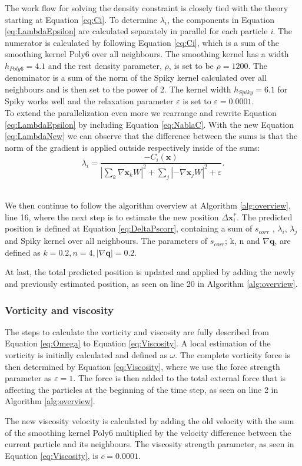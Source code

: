 The work flow for solving the density constraint is closely tied with the theory starting at Equation \ref{eq:Ci}.
To determine $\lambda_{i}$, the components in Equation \ref{eq:LambdaEpsilon} are calculated separately in parallel
for each particle \textit{i}.
The numerator is calculated by following Equation \ref{eq:Ci}, which is a sum of the smoothing kernel Poly6 over
all neighbours. The smoothing kernel has a width $h_{Poly6} = 4.1$ and the rest density parameter, $\rho$, is set to be $\rho = 1200$.
The denominator is a sum of the norm of the Spiky kernel calculated over all neighbours
and is then set to the power of 2. The kernel width $h_{Spiky} = 6.1$ for Spiky works well and the
relaxation parameter $\varepsilon$ is set to $\varepsilon = 0.0001$.
\\
\newline
To extend the parallelization even more we rearrange and rewrite Equation \ref{eq:LambdaEpsilon} by including Equation \ref{eq:NablaC}. With the
new Equation \ref{eq:LambdaNew} we can observe that the difference between the sums is that the norm of the gradient is applied
outside respectively inside of the sums:
\\
\begin{equation}
\label{eq:LambdaNew}
\lambda_i = \frac{- C_i(\mathbf{x}) }{ |\sum\limits_{k} \nabla \mathbf{x}_k W|^{2} + \sum\limits_{j} |-\nabla \mathbf{x}_j W|^2  + \varepsilon}.
\end{equation}
\\
\newline

We then continue to follow the algorithm overview at Algorithm \ref{alg:overview}, line 16, where the next step is to estimate the new position $\Delta \mathbf{x}^{*}_{i}$.
The predicted position is defined at Equation \ref{eq:DeltaPscorr}, containing a sum of $s_{corr}$ , $\lambda_{i}$, $\lambda_{j}$
and Spiky kernel over all neighbours.
The parameters of $s_{corr}$; k, n and $ \nabla \mathbf{q}$, are defined as $k = 0.2, n = 4, |\nabla \mathbf{q}| = 0.2$.

At last, the total predicted position is updated and applied by adding the newly and previously estimated position,
as seen on line 20 in Algorithm \ref{alg:overview}.

\subsubsection{Vorticity and viscosity}
The steps to calculate the vorticity and viscosity are fully described from Equation \ref{eq:Omega} to Equation \ref{eq:Viscosity}.
A local estimation of the vorticity is initially calculated and defined as $\omega$. The complete vorticity force is then determined
by Equation \ref{eq:Viscosity}, where we use the force strength parameter as $\varepsilon = 1$. The force is then added to the total
external force that is affecting the particles at the beginning of the time step, as seen on line 2 in Algorithm \ref{alg:overview}.

The new viscosity velocity is calculated by adding the old velocity with the sum of the smoothing kernel Poly6 multiplied by the velocity difference between
the current particle and its neighbours. The viscosity strength parameter, as seen in Equation \ref{eq:Viscosity}, is $c = 0.0001$.

